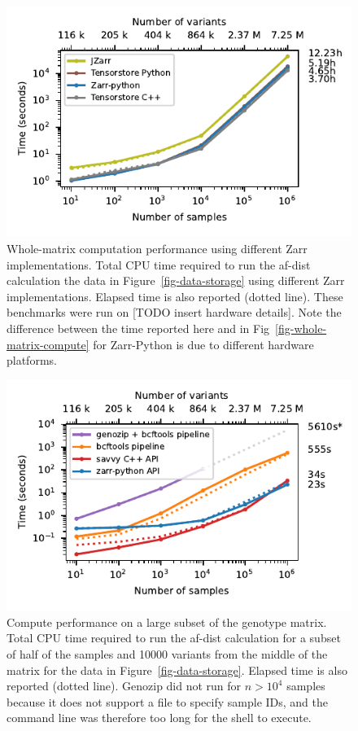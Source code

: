 \documentclass[a4paper,num-refs]{oup-contemporary}
\begin{document}
\begin{figure}[h]
\includegraphics{figures/whole-matrix-compute-zarr-versions}
\caption{Whole-matrix computation performance using different Zarr 
implementations. 
Total CPU time required to run the af-dist calculation
the data in Figure~\ref{fig-data-storage} using different Zarr implementations.
Elapsed time is also reported (dotted line). 
These benchmarks were run on [TODO insert hardware details].
Note the difference between the
time reported here and in Fig~\ref{fig-whole-matrix-compute} for Zarr-Python
is due to different hardware platforms.
\label{fig-whole-matrix-compute-zarr-versions}}
\end{figure}

\begin{figure}[h]
\includegraphics{figures/subset-matrix-compute-supplemental}
\caption{Compute performance on a large subset of the genotype matrix.
Total CPU time required to run the af-dist calculation for
a subset of half of the samples and 10000 variants from the middle of the matrix
for the data in Figure~\ref{fig-data-storage}.
Elapsed time is also reported (dotted line). 
Genozip did not run for
$n > 10^4$ samples because it does not support a file to specify
sample IDs, and the command line was therefore too long for the shell
to execute. 
\label{fig-subset-matrix-compute-supplemental}}
\end{figure}
\end{document}
